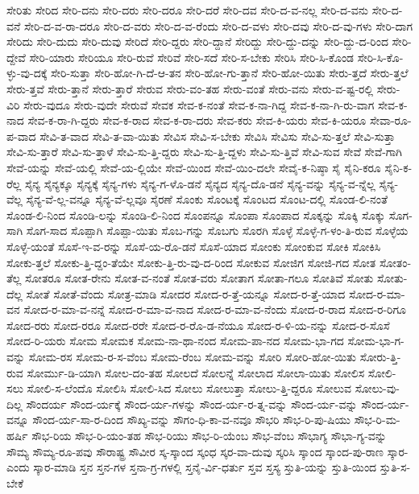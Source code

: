 {ಸೇರಿತು
ಸೇರಿದ
ಸೇರಿ-ದನು
ಸೇರಿ-ದರು
ಸೇರಿ-ದರೂ
ಸೇರಿ-ದರೆ
ಸೇರಿ-ದವ
ಸೇರಿ-ದ-ವ-ನಲ್ಲ
ಸೇರಿ-ದ-ವನು
ಸೇರಿ-ದ-ವನೆ
ಸೇರಿ-ದ-ವ-ರಾ-ದರೂ
ಸೇರಿ-ದ-ವರು
ಸೇರಿ-ದ-ವ-ರೆಂದು
ಸೇರಿ-ದ-ವಳು
ಸೇರಿ-ದವು
ಸೇರಿ-ದ-ವು-ಗಳು
ಸೇರಿ-ದಾಗ
ಸೇರಿದು
ಸೇರಿ-ದುದು
ಸೇರಿ-ದುವು
ಸೇರಿದೆ
ಸೇರಿ-ದ್ದರು
ಸೇರಿ-ದ್ದಾನೆ
ಸೇರಿದ್ದು
ಸೇರಿ-ದ್ದು-ದನ್ನು
ಸೇರಿ-ದ್ದು-ದ-ರಿಂದ
ಸೇರಿ-ದ್ದೇವೆ
ಸೇರಿ-ಯಾರು
ಸೇರಿಯೂ
ಸೇರಿ-ರುವೆ
ಸೇರಿವೆ
ಸೇರಿ-ಸದೆ
ಸೇರಿ-ಸ-ಬೇಕು
ಸೇರಿಸಿ
ಸೇರಿ-ಸಿ-ಕೊಂಡ
ಸೇರಿ-ಸಿ-ಕೊ-ಳ್ಳು-ವು-ದಕ್ಕೆ
ಸೇರಿ-ಸುತ್ತಾ
ಸೇರಿ-ಹೋ-ಗಿ-ದೆ-ಆ-ತನ
ಸೇರಿ-ಹೋ-ಗು-ತ್ತಾನೆ
ಸೇರಿ-ಹೋ-ಯಿತು
ಸೇರು-ತ್ತದೆ
ಸೇರು-ತ್ತಲೆ
ಸೇರು-ತ್ತವೆ
ಸೇರು-ತ್ತಾನೆ
ಸೇರು-ತ್ತಾರೆ
ಸೇರುವ
ಸೇರು-ವಂ-ತಹ
ಸೇರು-ವಂತೆ
ಸೇರು-ವನು
ಸೇರು-ವ-ಷ್ಟ-ರಲ್ಲಿ
ಸೇರು-ವಿರಿ
ಸೇರು-ವುದೂ
ಸೇರು-ವುದೇ
ಸೇರುವೆ
ಸೇವಕ
ಸೇವ-ಕ-ನಂತೆ
ಸೇವ-ಕ-ನಾ-ಗಿದ್ದ
ಸೇವ-ಕ-ನಾ-ಗಿ-ರು-ವಾಗ
ಸೇವ-ಕ-ನಾದ
ಸೇವ-ಕ-ರಾ-ಗಿ-ದ್ದರು
ಸೇವ-ಕ-ರಾದ
ಸೇವ-ಕ-ರಾ-ದರು
ಸೇವ-ಕರು
ಸೇವ-ಕಿ-ಯರು
ಸೇವ-ಕಿ-ಯರೂ
ಸೇವಾ-ರೂ-ಪ-ವಾದ
ಸೇವಿ-ತ-ವಾದ
ಸೇವಿ-ತ-ವಾ-ಯಿತು
ಸೇವಿಸ
ಸೇವಿ-ಸ-ಬೇಕು
ಸೇವಿಸಿ
ಸೇವಿಸು
ಸೇವಿ-ಸು-ತ್ತಲೆ
ಸೇವಿ-ಸುತ್ತಾ
ಸೇವಿ-ಸು-ತ್ತಾರೆ
ಸೇವಿ-ಸು-ತ್ತಾಳೆ
ಸೇವಿ-ಸು-ತ್ತಿ-ದ್ದರು
ಸೇವಿ-ಸು-ತ್ತಿ-ದ್ದಳು
ಸೇವಿ-ಸು-ತ್ತಿವೆ
ಸೇವಿ-ಸುವ
ಸೇವೆ
ಸೇವೆ-ಗಾಗಿ
ಸೇವೆ-ಯನ್ನು
ಸೇವೆ-ಯಲ್ಲಿ
ಸೇವೆ-ಯ-ಲ್ಲಿಯೇ
ಸೇವೆ-ಯಿಂದ
ಸೇವೆ-ಯಿಂ-ದಲೇ
ಸೇವೈ-ಕ-ನಿಷ್ಠಾ
ಸೈ
ಸೈನಿ-ಕರೂ
ಸೈನಿ-ಕ-ರೆಲ್ಲ
ಸೈನ್ಯ
ಸೈನ್ಯಕ್ಕೂ
ಸೈನ್ಯಕ್ಕೆ
ಸೈನ್ಯ-ಗಳು
ಸೈನ್ಯ-ಗ-ಳೊ-ಡನೆ
ಸೈನ್ಯದ
ಸೈನ್ಯ-ದೊ-ಡನೆ
ಸೈನ್ಯ-ವನ್ನು
ಸೈನ್ಯ-ವ-ನ್ನೆಲ್ಲ
ಸೈನ್ಯ-ವೆಲ್ಲ
ಸೈನ್ಯ-ವೆ-ಲ್ಲ-ವನ್ನೂ
ಸೈನ್ಯ-ವೆ-ಲ್ಲವೂ
ಸೈರಣೆ
ಸೊಂಕು
ಸೊಂಟಕ್ಕೆ
ಸೊಂಟದ
ಸೊಂಟ-ದಲ್ಲಿ
ಸೊಂಡ-ಲಿ-ನಂತೆ
ಸೊಂಡ-ಲಿ-ನಿಂದ
ಸೊಂಡಿ-ಲನ್ನು
ಸೊಂಡಿ-ಲಿ-ನಿಂದ
ಸೊಂಪನ್ನೂ
ಸೊಂಪಾ
ಸೊಂಪಾದ
ಸೊಕ್ಕನ್ನು
ಸೊಕ್ಕಿ
ಸೊಕ್ಕು
ಸೊಗ-ಸಾಗಿ
ಸೊಗ-ಸಾದ
ಸೊಪ್ಪಾಗಿ
ಸೊಪ್ಪಾ-ಯಿತು
ಸೊಬ-ಗನ್ನು
ಸೊಬಗು
ಸೊರಗಿ
ಸೊಳ್ಳೆ
ಸೊಳ್ಳೆ-ಗ-ಳಂ-ತಿ-ರುವ
ಸೊಳ್ಳೆಯ
ಸೊಳ್ಳೆ-ಯಂತೆ
ಸೊಸೆ-ಇ-ವ-ರನ್ನು
ಸೊಸೆ-ಯ-ರೊ-ಡನೆ
ಸೊಸೆ-ಯಾದ
ಸೋಂಕು
ಸೋಂಕುವ
ಸೋಕಿ
ಸೋಕಿಸಿ
ಸೋಕು-ತ್ತಲೆ
ಸೋಕು-ತ್ತಿ-ದ್ದಂ-ತೆಯೇ
ಸೋಕು-ತ್ತಿ-ರು-ವು-ದ-ರಿಂದ
ಸೋಕುವ
ಸೋಜಿಗ
ಸೋಜಿ-ಗದ
ಸೋತ
ಸೋತಂ-ತೆಲ್ಲ
ಸೋತರೂ
ಸೋತ-ರೇನು
ಸೋತ-ವ-ನಂತೆ
ಸೋತ-ವರು
ಸೋತಾಗ
ಸೋತಾ-ಗಲೂ
ಸೋತಿವೆ
ಸೋತು
ಸೋತು-ದೆಲ್ಲ
ಸೋತೆ
ಸೋತೆ-ವೆಂದು
ಸೋತ್ರ-ಮಾಡಿ
ಸೋದರ
ಸೋದ-ರ-ತ್ತೆ-ಯನ್ನೂ
ಸೋದ-ರ-ತ್ತೆ-ಯಾದ
ಸೋದ-ರ-ಮಾ-ವನ
ಸೋದ-ರ-ಮಾ-ವ-ನನ್ನೆ
ಸೋದ-ರ-ಮಾ-ವ-ನಾದ
ಸೋದ-ರ-ಮಾ-ವ-ನೆಂದು
ಸೋದ-ರ-ರಾದ
ಸೋದ-ರ-ರಿಗೂ
ಸೋದ-ರರು
ಸೋದ-ರರೂ
ಸೋದ-ರರೇ
ಸೋದ-ರ-ರೊ-ಡ-ನೆಯೂ
ಸೋದ-ರ-ಳಿ-ಯ-ನನ್ನು
ಸೋದ-ರ-ಸೊಸೆ
ಸೋದ-ರಿ-ಯರು
ಸೋಮ
ಸೋಮಕ
ಸೋಮ-ನಾ-ಥಾ-ನಂದ
ಸೋಮ-ಪಾ-ನದ
ಸೋಮ-ಭಾ-ಗದ
ಸೋಮ-ಭಾ-ಗ-ವನ್ನು
ಸೋಮ-ರಸ
ಸೋಮ-ರ-ಸ-ವೆಂಬ
ಸೋಮ-ರೆಂಬ
ಸೋಮ-ವನ್ನು
ಸೋರಿ
ಸೋರಿ-ಹೋ-ಯಿತು
ಸೋರು-ತ್ತಿ-ರುವ
ಸೋರ್ಮು-ಡಿ-ಯಾಗಿ
ಸೋಲ-ದಂ-ತಹ
ಸೋಲದೆ
ಸೋಲನ್ನೆ
ಸೋಲಾದ
ಸೋಲಾ-ಯಿತು
ಸೋಲಿಸ
ಸೋಲಿ-ಸಲು
ಸೋಲಿ-ಸ-ಲೆಂದೊ
ಸೋಲಿಸಿ
ಸೋಲಿ-ಸಿದ
ಸೋಲು
ಸೋಲುತ್ತಾ
ಸೋಲು-ತ್ತಿ-ದ್ದರೂ
ಸೋಲುವ
ಸೋಲು-ವು-ದಿಲ್ಲ
ಸೌಂದರ್ಯ
ಸೌಂದ-ರ್ಯಕ್ಕೆ
ಸೌಂದ-ರ್ಯ-ಗಳನ್ನು
ಸೌಂದ-ರ್ಯ-ರ-ತ್ನ-ವನ್ನು
ಸೌಂದ-ರ್ಯ-ವನ್ನು
ಸೌಂದ-ರ್ಯ-ವನ್ನೂ
ಸೌಂದ-ರ್ಯ-ಸಾ-ರ-ದಿಂದ
ಸೌಖ್ಯ-ವನ್ನು
ಸೌಗಂ-ಧಿ-ಕಾ-ವ-ನವೂ
ಸೌಭರಿ
ಸೌಭ-ರಿ-ಪು-ಷಿಯು
ಸೌಭ-ರಿ-ಮ-ಹರ್ಷಿ
ಸೌಭ-ರಿಯ
ಸೌಭ-ರಿ-ಯಂ-ತಹ
ಸೌಭ-ರಿಯು
ಸೌಭ-ರಿ-ಯೆಂಬ
ಸೌಭ-ವೆಂಬ
ಸೌಭಾಗ್ಯ
ಸೌಭಾ-ಗ್ಯ-ವನ್ನು
ಸೌಮ್ಯ
ಸೌಮ್ಯ-ರೂ-ಪವು
ಸೌರಾಷ್ಟ್ರ
ಸೌವೀರ
ಸ್ಕ-ಸ್ಕಾಂದ
ಸ್ಕಂಧ
ಸ್ಕರ-ವಾ-ದುವು
ಸ್ಕರಿಸಿ
ಸ್ಕಾಂದ
ಸ್ಕಾಂದ-ಪು-ರಾಣ
ಸ್ಕಾರ-ಎಂದು
ಸ್ಕಾರ-ಮಾಡಿ
ಸ್ತನ
ಸ್ತನ-ಗಳ
ಸ್ತನಾ-ಗ್ರ-ಗಳಲ್ಲಿ
ಸ್ತನೈ-ರ್ವಿ-ಧರ್ತು
ಸ್ತವ
ಸ್ತಸ್ಯ
ಸ್ತುತಿ-ಯನ್ನು
ಸ್ತುತಿ-ಯಿಂದ
ಸ್ತುತಿ-ಸ-ಬೇಕೆ
}
